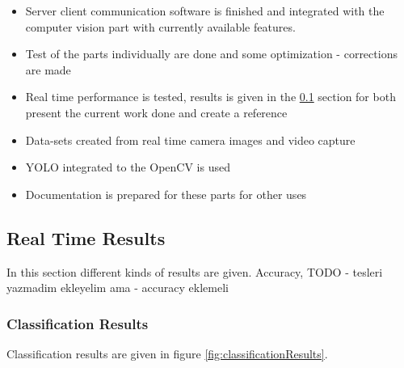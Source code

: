 \begin{itemize}
    \item Server client communication software is finished and integrated with the computer vision part with currently available features.
    \item Test of the parts individually are done and some optimization - corrections are made
    \item Real time performance is tested, results is given in the \ref{subsec:realTime} section for both present the current work done and create a reference
    \item Data-sets created from real time camera images and video capture
    \item YOLO integrated to the OpenCV is used
    \item Documentation is prepared for these parts for other uses
\end{itemize}


\subsection{Real Time Results}
\label{subsec:realTime}
In this section different kinds of results are given. Accuracy, 
TODO - tesleri yazmadim ekleyelim ama - accuracy eklemeli
\subsubsection{Classification Results}
Classification results are given in figure \ref{fig:classificationResults}.

